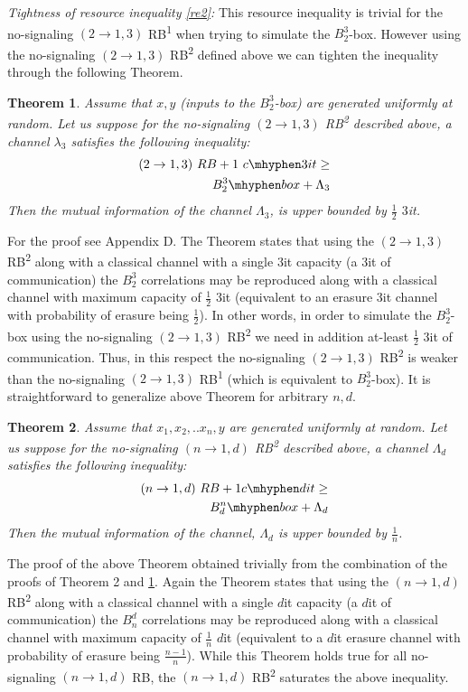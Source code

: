\documentclass[%
 reprint,
 amsmath,amssymb,
 aps,
]{revtex4-1}
\newtheorem{mydef1}{Theorem}
\begin{document}
\textit{Tightness of resource inequality \ref{re2}:} This resource inequality is trivial for the no-signaling $(2\rightarrow 1,3)$ RB\textsuperscript{1} when trying to simulate the $B^3_2$-box. However using the no-signaling $(2\rightarrow 1,3)$ RB\textsuperscript{2} defined above we can tighten the inequality through the following Theorem.
\begin{mydef1} \label{thm6}
Assume that $x,y$ (inputs to the $ B_2^3$-box)  are generated uniformly at random. Let us suppose for the no-signaling $(2\rightarrow 1,3)$ RB\textsuperscript{2} described above, a channel $\lambda_3$ satisfies the following inequality:
\begin{eqnarray}
(2\rightarrow1,3)\ RB + 1\  c\mhyphen 3it \geq \nonumber \\ B_2^3\mhyphen box + \Lambda_3
\end{eqnarray}
Then the mutual information of the channel $\Lambda_3$,  is upper bounded by $\frac{1}{2}$ $3$it.
\end{mydef1}
For the proof see Appendix D. The Theorem states that using the $(2\rightarrow 1,3)$ RB\textsuperscript{2} along with a classical channel with a single $3$it capacity (a $3$it of communication) the $B_2^3$ correlations may be reproduced along with a classical channel with maximum capacity of $\frac{1}{2}$ $3$it (equivalent to an erasure $3$it channel with probability of erasure being $\frac{1}{2}$). In other words, in order to simulate the $B_2^3$-box using the no-signaling $(2\rightarrow 1,3)$ RB\textsuperscript{2} we need in addition at-least $\frac{1}{2}$ $3$it of communication. Thus, in this respect the no-signaling $(2\rightarrow 1,3)$ RB\textsuperscript{2} is weaker than the no-signaling $(2\rightarrow 1,3)$ RB\textsuperscript{1} (which is equivalent to $B^3_2$-box). It is straightforward to generalize above Theorem for arbitrary $n,d$. 
\begin{mydef1} \label{thm7}
Assume that $x_1,x_2,..x_n,y$  are generated uniformly at random. Let us suppose for the no-signaling $(n\rightarrow 1,d)$ RB\textsuperscript{2} described above, a channel $\Lambda_d$ satisfies the following inequality:
\begin{eqnarray}
(n\rightarrow1,d)\ RB + 1  c \mhyphen dit \geq \nonumber \\ B_d^n\mhyphen box + \Lambda_d
\end{eqnarray}
Then the mutual information of the channel, $\Lambda_d$ is upper bounded by $\frac{1}{n}$.
\end{mydef1}
The proof of the above Theorem obtained trivially from the combination of the proofs of Theorem 2 and \ref{thm6}. Again the Theorem states that using the $(n\rightarrow 1,d)$ RB\textsuperscript{2} along with a classical channel with a single $d$it capacity (a $d$it of communication) the $B_n^d$ correlations may be reproduced along with a classical channel with maximum capacity of $\frac{1}{n}$ $d$it (equivalent to a $d$it erasure channel with probability of erasure being $\frac{n-1}{n}$). While this Theorem holds true for all no-signaling $(n\rightarrow1,d)$ RB, the $(n\rightarrow1,d)$ RB\textsuperscript{2} saturates the above inequality.
\end{document}
